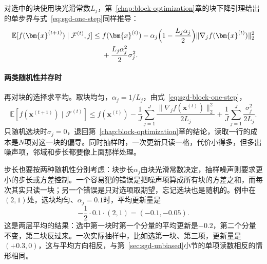对选中的块使用块光滑常数$L_j$，第~\ref{chap:block-optimization}章的块下降引理给出的单步界与式~\eqref{eq:sgd-one-step}同样推导：
\begin{equation}
 \begin{aligned}
 \mathbb{E}[f(\bm{x}^{(t+1)})\mid\mathcal{F}^{(t)},j]
 \leq{}&f(\bm{x}^{(t)})-\alpha_j\Bigl(1-\frac{L_j\alpha_j}{2}\Bigr)\lVert\nabla_jf(\bm{x}^{(t)})\rVert_2^2\\
 &+\frac{L_j\alpha_j^2}{2}\sigma_j^2.
 \end{aligned}
 \label{eq:sgd-block-one-step}
\end{equation}

\paragraph{两类随机性并存时}
再对块的选择求平均。取块均匀，$\alpha_j=1/L_j$，由式~\eqref{eq:sgd-block-one-step}，
\[
 \mathbb{E}[f(\bm{x}^{(t+1)})\mid\mathcal{F}^{(t)}]\leq f(\bm{x}^{(t)})-\frac{1}{J}\sum_{j=1}^{J}\frac{\lVert\nabla_jf(\bm{x}^{(t)})\rVert_2^2}{2L_j}+\frac{1}{J}\sum_{j=1}^{J}\frac{\sigma_j^2}{2L_j}.
\]
只随机选块时$\sigma_j=0$，退回第~\ref{chap:block-optimization}章的结论，读取一行的成本是$N$项对这一块的偏导。同时抽样时，一次更新只读一格，代价小得多，但多出噪声项，邻域和步长都要像上面那样处理。

步长也要按两种随机性分别考虑：块步长$\alpha_j$由块光滑常数决定，抽样噪声则要求更小的步长或方差控制。一个容易犯的错误是把噪声项算成所有块的方差之和，而每次其实只读一块；另一个错误是只对选项取期望，忘记选块也是随机的。例中在$(2,1)$处，选块均匀、$\alpha_j=0.1$时，平均更新量是
\[
 -\frac12\cdot0.1\cdot(2,1)=(-0.1,-0.05).
\]
这是两层平均的结果：选中第一块时第一个分量的平均更新是$-0.2$，第二个分量不变，第二块反过来。一次实际抽样中，比如选第一块、第三项，更新量是$(+0.3,0)$，这与平均方向相反，与第~\ref{sec:sgd-unbiased}小节的单项读数相反的情形相同。
